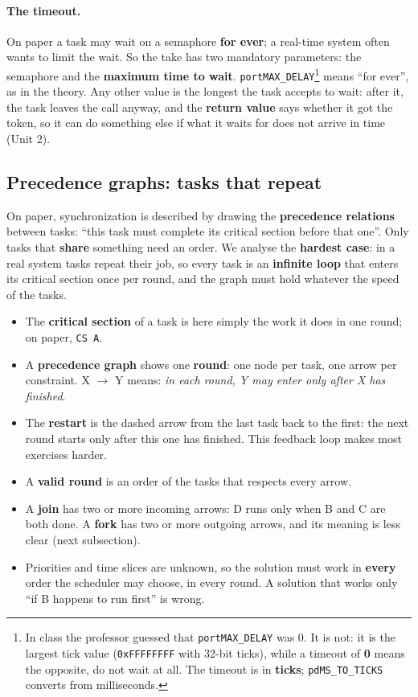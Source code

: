 \paragraph{The timeout.} On paper a task may wait on a semaphore \textbf{for ever}; a real-time system often wants to limit the wait. So the take has two mandatory parameters: the semaphore and the \textbf{maximum time to wait}. \texttt{portMAX\_DELAY}\footnote{In class the professor guessed that \texttt{portMAX\_DELAY} was 0. It is not: it is the largest tick value (\texttt{0xFFFFFFFF} with 32-bit ticks), while a timeout of \textbf{0} means the opposite, do not wait at all. The timeout is in \textbf{ticks}; \texttt{pdMS\_TO\_TICKS} converts from milliseconds.} means ``for ever'', as in the theory. Any other value is the longest the task accepts to wait: after it, the task leaves the call anyway, and the \textbf{return value} says whether it got the token, so it can do something else if what it waits for does not arrive in time (Unit 2).

\subsection{Precedence graphs: tasks that repeat}
On paper, synchronization is described by drawing the \textbf{precedence relations} between tasks: ``this task must complete its critical section before that one''. Only tasks that \textbf{share} something need an order. We analyse the \textbf{hardest case}: in a real system tasks repeat their job, so every task is an \textbf{infinite loop} that enters its critical section once per round, and the graph must hold whatever the speed of the tasks.
\begin{itemize}
    \item The \textbf{critical section} of a task is here simply the work it does in one round; on paper, \texttt{CS A}.
    \item A \textbf{precedence graph} shows one \textbf{round}: one node per task, one arrow per constraint. X $\rightarrow$ Y means: \emph{in each round, Y may enter only after X has finished}.
    \item The \textbf{restart} is the dashed arrow from the last task back to the first: the next round starts only after this one has finished. This feedback loop makes most exercises harder.
    \item A \textbf{valid round} is an order of the tasks that respects every arrow.
    \item A \textbf{join} has two or more incoming arrows: D runs only when B and C are both done. A \textbf{fork} has two or more outgoing arrows, and its meaning is less clear (next subsection).
    \item Priorities and time slices are unknown, so the solution must work in \textbf{every} order the scheduler may choose, in every round. A solution that works only ``if B happens to run first'' is wrong.
\end{itemize}

